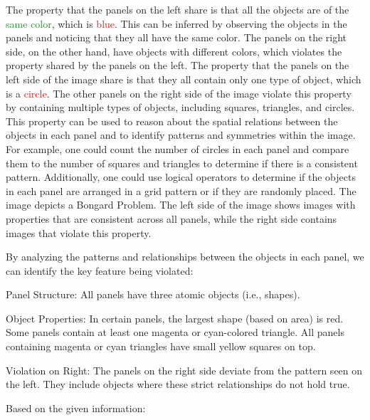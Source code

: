 \begin{tcolorbox}[breakable,enhanced jigsaw,opacityback=0,]
\begin{dialogue}
		The property that the panels on the left share is that all the objects are of the \textcolor{ForestGreen}{same color}, which is \textcolor{red}{blue}. This can be inferred by observing the objects in the panels and noticing that they all have the same color. The panels on the right side, on the other hand, have objects with different colors, which violates the property shared by the panels on the left.
		\vspace{1em}
		 The property that the panels on the left side of the image share is that they all contain only one type of object, which is a \textcolor{red}{circle}. The other panels on the right side of the image violate this property by containing multiple types of objects, including squares, triangles, and circles. This property can be used to reason about the spatial relations between the objects in each panel and to identify patterns and symmetries within the image. For example, one could count the number of circles in each panel and compare them to the number of squares and triangles to determine if there is a consistent pattern. Additionally, one could use logical operators to determine if the objects in each panel are arranged in a grid pattern or if they are randomly placed.
		\vspace{1em}
		 The image depicts a Bongard Problem. The left side of the image shows images with properties that are consistent across all panels, while the right side contains images that violate this property.
		
		By analyzing the patterns and relationships between the objects in each panel, we can identify the key feature being violated:
		
		Panel Structure: All panels have three atomic objects (i.e., shapes).
		
		Object Properties:
		In certain panels, the largest shape (based on area) is red.
		Some panels contain at least one magenta or cyan-colored triangle.
		All panels containing magenta or cyan triangles have small yellow squares on top.
		
		Violation on Right: The panels on the right side deviate from the pattern seen on the left. They include objects where these strict relationships do not hold true.
		
		Based on the given information:
		

\end{dialogue}
\end{tcolorbox}
